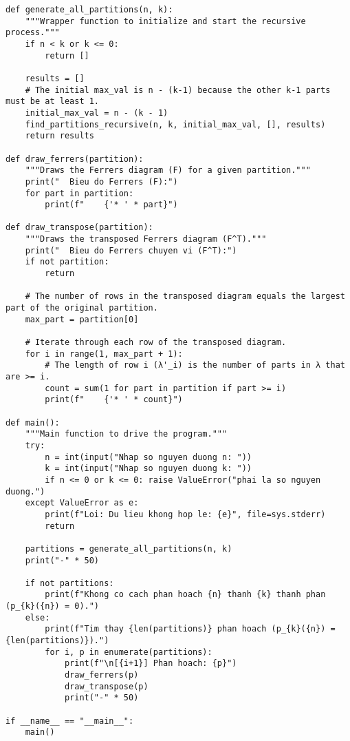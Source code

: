 \documentclass[a4paper,12pt]{article}
\begin{document}
\begin{lstlisting}[style=pythonstyle, caption={Partition enumeration and Ferrers diagrams in Python.}, label={lst:python_partition_eng}]
def generate_all_partitions(n, k):
    """Wrapper function to initialize and start the recursive process."""
    if n < k or k <= 0:
        return []
    
    results = []
    # The initial max_val is n - (k-1) because the other k-1 parts must be at least 1.
    initial_max_val = n - (k - 1)
    find_partitions_recursive(n, k, initial_max_val, [], results)
    return results

def draw_ferrers(partition):
    """Draws the Ferrers diagram (F) for a given partition."""
    print("  Bieu do Ferrers (F):")
    for part in partition:
        print(f"    {'* ' * part}")

def draw_transpose(partition):
    """Draws the transposed Ferrers diagram (F^T)."""
    print("  Bieu do Ferrers chuyen vi (F^T):")
    if not partition:
        return
        
    # The number of rows in the transposed diagram equals the largest part of the original partition.
    max_part = partition[0]
    
    # Iterate through each row of the transposed diagram.
    for i in range(1, max_part + 1):
        # The length of row i (λ'_i) is the number of parts in λ that are >= i.
        count = sum(1 for part in partition if part >= i)
        print(f"    {'* ' * count}")

def main():
    """Main function to drive the program."""
    try:
        n = int(input("Nhap so nguyen duong n: "))
        k = int(input("Nhap so nguyen duong k: "))
        if n <= 0 or k <= 0: raise ValueError("phai la so nguyen duong.")
    except ValueError as e:
        print(f"Loi: Du lieu khong hop le: {e}", file=sys.stderr)
        return

    partitions = generate_all_partitions(n, k)
    print("-" * 50)
    
    if not partitions:
        print(f"Khong co cach phan hoach {n} thanh {k} thanh phan (p_{k}({n}) = 0).")
    else:
        print(f"Tim thay {len(partitions)} phan hoach (p_{k}({n}) = {len(partitions)}).")
        for i, p in enumerate(partitions):
            print(f"\n[{i+1}] Phan hoach: {p}")
            draw_ferrers(p)
            draw_transpose(p)
            print("-" * 50)

if __name__ == "__main__":
    main()
\end{lstlisting}
\end{document}
